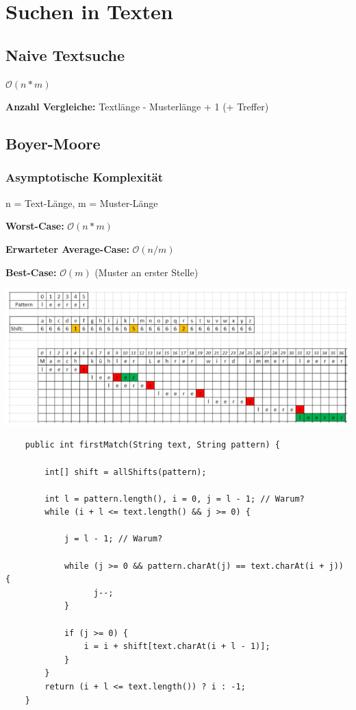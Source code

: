 \section*{Suchen in Texten}
\subsection*{Naive Textsuche}

$\mathcal{O}(n*m)$

\textbf{Anzahl Vergleiche:} Textlänge - Musterlänge + 1 (+ Treffer)

\subsection*{Boyer-Moore}

\subsubsection*{Asymptotische Komplexität}
n = Text-Länge, m = Muster-Länge

\textbf{Worst-Case:} $\mathcal{O}(n*m)$

\textbf{Erwarteter Average-Case:} $\mathcal{O}(n/m)$

\textbf{Best-Case:} $\mathcal{O}(m)$ (Muster an erster Stelle)

\includegraphics[width=\linewidth]{images/boyermoore}

\begin{verbatim}
    public int firstMatch(String text, String pattern) {

        int[] shift = allShifts(pattern);

        int l = pattern.length(), i = 0, j = l - 1; // Warum?
        while (i + l <= text.length() && j >= 0) {

            j = l - 1; // Warum?

            while (j >= 0 && pattern.charAt(j) == text.charAt(i + j)) {
                  j--;
            }

            if (j >= 0) {
                i = i + shift[text.charAt(i + l - 1)];
            }
        }
        return (i + l <= text.length()) ? i : -1;
    }
\end{verbatim}